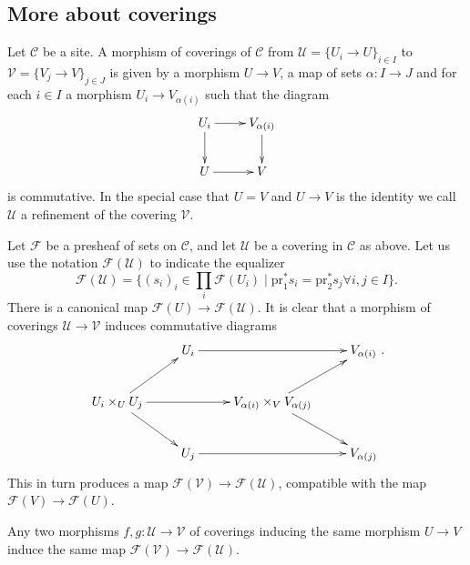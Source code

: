 \subsection{More about coverings}
\label{subsection-coverings}

\noindent
Let $\mathcal{C}$ be a site. A morphism of coverings of $\mathcal{C}$ from 
$\mathcal{U}=\{U_i \to U\}_{i\in I}$ to $\mathcal{V}=\{V_j \to V\}_{j\in J}$
is given by a morphism $U \to V$, a map of sets $\alpha : I \to J$ and
for each $i\in I$ a morphism $U_i \to V_{\alpha(i)}$ such that
the diagram
$$
\xymatrix{
U_i \ar[r] \ar[d] & V_{\alpha(i)} \ar[d] \\
U \ar[r] & V
}
$$
is commutative. In the special case that $U=V$ and $U\to V$ is the identity
we call $\mathcal{U}$ a refinement of the covering $\mathcal{V}$.

\smallskip\noindent
Let $\mathcal{F}$ be a presheaf of sets on $\mathcal{C}$, and let
$\mathcal{U}$ be a covering in $\mathcal{C}$ as above. Let us use the
notation $\mathcal{F}(\mathcal{U})$ to indicate the equalizer
$$
\mathcal{F}(\mathcal{U}) = \{ (s_i)_i \in \prod_i \mathcal{F}(U_i)
\mid  \text{pr}_1^\ast s_i = \text{pr}_2^\ast s_j \forall i,j \in I\}.
$$
There is a canonical map $\mathcal{F}(U) \to \mathcal{F}(\mathcal{U})$.
It is clear that a morphism of coverings $\mathcal{U} \to \mathcal{V}$
induces commutative diagrams
$$
\xymatrix{
& U_i \ar[rr] & & V_{\alpha(i)} \\
U_i \times_U U_j \ar[rr] \ar[ur] \ar[dr] & & 
V_{\alpha(i)}\times_V V_{\alpha(j)} \ar[ur] \ar[dr] & \\
& U_j \ar[rr] & & V_{\alpha(j)}
}.
$$
This in turn produces a map $\mathcal{F}(\mathcal{V}) \to 
\mathcal{F}(\mathcal{U})$, compatible with the map $\mathcal{F}(V) 
\to \mathcal{F}(U)$. 

\begin{lemma}
\label{lemma-indepent-refinement}
Any two morphisms $f,g: \mathcal{U} \to \mathcal{V}$ of coverings
inducing the same morphism $U \to V$ induce the same
map $\mathcal{F}(\mathcal{V}) \to \mathcal{F}(\mathcal{U})$.
\end{lemma}

